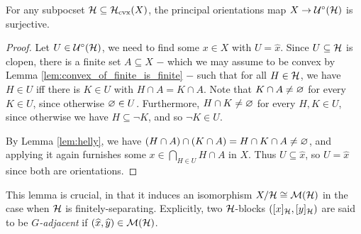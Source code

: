 \documentclass[reqno]{amsart}
\begin{document}
    \begin{lemma}\label{lem:H_blocks_form_a_median_graph}
        For any subpocset $\mc{H}\subseteq\mc{H}_\mathrm{cvx}(X)$, the principal orientations map $X\to\mc{U}^\circ(\mc{H})$ is surjective.
    \end{lemma}
    \begin{proof}
        Let $U\in\mc{U}^\circ(\mc{H})$, we need to find some $x\in X$ with $U=\widehat{x}$. Since $U\subseteq\mc{H}$ is clopen, there is a finite set $A\subseteq X$ $-$ which we may assume to be convex by Lemma \ref{lem:convex_of_finite_is_finite} $-$ such that for all $H\in\mc{H}$, we have $H\in U$ iff there is $K\in U$ with $H\cap A=K\cap A$. Note that $K\cap A\neq\em$ for every $K\in U$, since otherwise $\em\in U$. Furthermore, $H\cap K\neq\em$ for every $H,K\in U$, since otherwise we have $H\subseteq\lnot K$, and so $\lnot K\in U$.

        By Lemma \ref{lem:helly}, we have $(H\cap A)\cap(K\cap A)=H\cap K\cap A\neq\em$, and applying it again furnishes some $x\in\bigcap_{H\in U}H\cap A$ in $X$. Thus $U\subseteq\widehat{x}$, so $U=\widehat{x}$ since both are orientations.
    \end{proof}

    This lemma is crucial, in that it induces an isomorphism $X/\mc{H}\iso\mc{M}(\mc{H})$ in the case when $\mc{H}$ is finitely-separating. Explicitly, two $\mc{H}$-blocks $([x]_\mc{H},[y]_\mc{H})$ are said to be \textit{$G$-adjacent} if $(\widehat{x},\widehat{y})\in\mc{M}(\mc{H})$.
\end{document}
